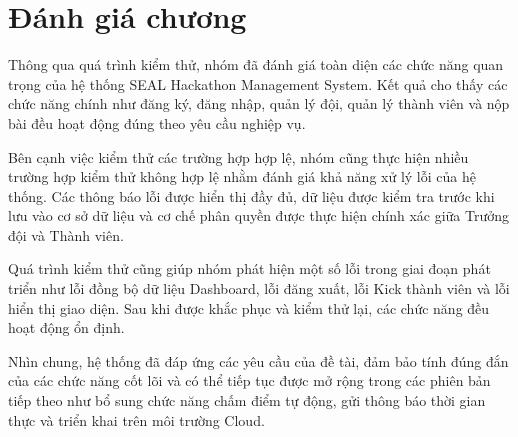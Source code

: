 \section{Đánh giá chương}

Thông qua quá trình kiểm thử, nhóm đã đánh giá toàn diện các chức năng quan trọng của hệ thống SEAL Hackathon Management System. Kết quả cho thấy các chức năng chính như đăng ký, đăng nhập, quản lý đội, quản lý thành viên và nộp bài đều hoạt động đúng theo yêu cầu nghiệp vụ.

Bên cạnh việc kiểm thử các trường hợp hợp lệ, nhóm cũng thực hiện nhiều trường hợp kiểm thử không hợp lệ nhằm đánh giá khả năng xử lý lỗi của hệ thống. Các thông báo lỗi được hiển thị đầy đủ, dữ liệu được kiểm tra trước khi lưu vào cơ sở dữ liệu và cơ chế phân quyền được thực hiện chính xác giữa Trưởng đội và Thành viên.

Quá trình kiểm thử cũng giúp nhóm phát hiện một số lỗi trong giai đoạn phát triển như lỗi đồng bộ dữ liệu Dashboard, lỗi đăng xuất, lỗi Kick thành viên và lỗi hiển thị giao diện. Sau khi được khắc phục và kiểm thử lại, các chức năng đều hoạt động ổn định.

Nhìn chung, hệ thống đã đáp ứng các yêu cầu của đề tài, đảm bảo tính đúng đắn của các chức năng cốt lõi và có thể tiếp tục được mở rộng trong các phiên bản tiếp theo như bổ sung chức năng chấm điểm tự động, gửi thông báo thời gian thực và triển khai trên môi trường Cloud.
